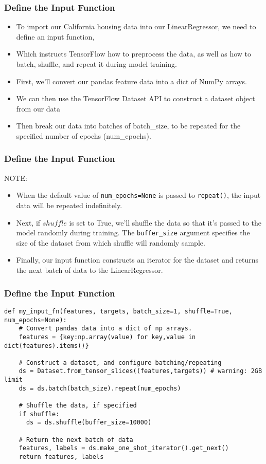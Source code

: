 \begin{frame}[fragile]\frametitle{Define the Input Function}
\begin{itemize}
\item  To import our California housing data into our LinearRegressor, we need to define an input function, 
\item Which instructs TensorFlow how to preprocess the data, as well as how to batch, shuffle, and repeat it during model training.
\item First, we'll convert our pandas feature data into a dict of NumPy arrays. 
\item We can then use the TensorFlow Dataset API to construct a dataset object from our data
\item Then break our data into batches of batch\_size, to be repeated for the specified number of epochs (num\_epochs).
\end{itemize}
\end{frame}

\begin{frame}[fragile]\frametitle{Define the Input Function}
NOTE:
\begin{itemize}
\item  When the default value of \lstinline|num_epochs=None| is passed to \lstinline|repeat()|, the input data will be repeated indefinitely.

\item Next, if $shuffle$ is set to True, we'll shuffle the data so that it's passed to the model randomly during training. The \lstinline|buffer_size| argument specifies the size of the dataset from which shuffle will randomly sample.

\item Finally, our input function constructs an iterator for the dataset and returns the next batch of data to the LinearRegressor.
\end{itemize}
\end{frame}


\begin{frame}[fragile]\frametitle{Define the Input Function}
\begin{lstlisting}
def my_input_fn(features, targets, batch_size=1, shuffle=True, num_epochs=None):
    # Convert pandas data into a dict of np arrays.
    features = {key:np.array(value) for key,value in dict(features).items()}                                           
 
    # Construct a dataset, and configure batching/repeating
    ds = Dataset.from_tensor_slices((features,targets)) # warning: 2GB limit
    ds = ds.batch(batch_size).repeat(num_epochs)
    
    # Shuffle the data, if specified
    if shuffle:
      ds = ds.shuffle(buffer_size=10000)
    
    # Return the next batch of data
    features, labels = ds.make_one_shot_iterator().get_next()
    return features, labels
\end{lstlisting}

\end{frame}


